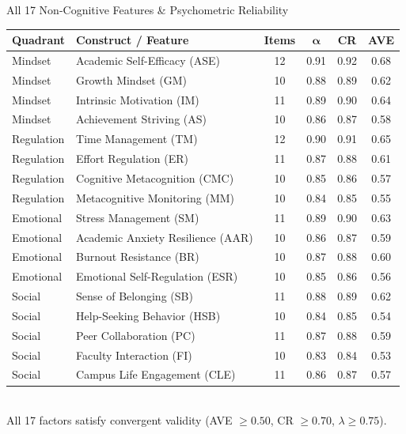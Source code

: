 \documentclass{beamer}
\begin{document}
\begin{frame}{All 17 Non-Cognitive Features \& Psychometric Reliability}
  \centering
  \scriptsize
  \begin{tabular}{llcccc}
    \toprule
    \textbf{Quadrant} & \textbf{Construct / Feature} & \textbf{Items} & $\boldsymbol{\alpha}$ & \textbf{CR} & \textbf{AVE} \\
    \midrule
    Mindset & Academic Self-Efficacy (ASE) & 12 & 0.91 & 0.92 & 0.68 \\
    Mindset & Growth Mindset (GM) & 10 & 0.88 & 0.89 & 0.62 \\
    Mindset & Intrinsic Motivation (IM) & 11 & 0.89 & 0.90 & 0.64 \\
    Mindset & Achievement Striving (AS) & 10 & 0.86 & 0.87 & 0.58 \\
    \midrule
    Regulation & Time Management (TM) & 12 & 0.90 & 0.91 & 0.65 \\
    Regulation & Effort Regulation (ER) & 11 & 0.87 & 0.88 & 0.61 \\
    Regulation & Cognitive Metacognition (CMC) & 10 & 0.85 & 0.86 & 0.57 \\
    Regulation & Metacognitive Monitoring (MM) & 10 & 0.84 & 0.85 & 0.55 \\
    \midrule
    Emotional & Stress Management (SM) & 11 & 0.89 & 0.90 & 0.63 \\
    Emotional & Academic Anxiety Resilience (AAR) & 10 & 0.86 & 0.87 & 0.59 \\
    Emotional & Burnout Resistance (BR) & 10 & 0.87 & 0.88 & 0.60 \\
    Emotional & Emotional Self-Regulation (ESR) & 10 & 0.85 & 0.86 & 0.56 \\
    \midrule
    Social & Sense of Belonging (SB) & 11 & 0.88 & 0.89 & 0.62 \\
    Social & Help-Seeking Behavior (HSB) & 10 & 0.84 & 0.85 & 0.54 \\
    Social & Peer Collaboration (PC) & 11 & 0.87 & 0.88 & 0.59 \\
    Social & Faculty Interaction (FI) & 10 & 0.83 & 0.84 & 0.53 \\
    Social & Campus Life Engagement (CLE) & 11 & 0.86 & 0.87 & 0.57 \\
    \bottomrule
  \end{tabular}
  \\[0.1cm]
  {\tiny All 17 factors satisfy convergent validity (AVE $\ge 0.50$, CR $\ge 0.70$, $\lambda \ge 0.75$).}
\end{frame}
\end{document}
